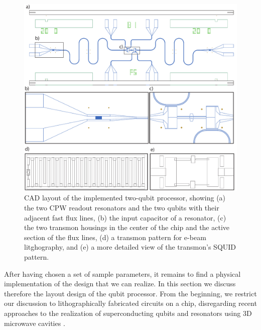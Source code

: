 \begin{figure}[ht!]
	\centering
	\includegraphics[width=\textwidth]{./material/figures/2-qubit-processor/fabrication/qubit_processor_layout}
	\caption[]{CAD layout of the implemented two-qubit processor, showing (a) the two CPW readout resonators and the two qubits with their adjacent fast flux lines, (b) the input capacitor of a resonator, (c) the two transmon housings in the center of the chip and the active section of the flux lines, (d) a transmon pattern for e-beam litghography, and (e) a more detailed view of the transmon's SQUID pattern.}
	\label{fig:processor_fabrication}
\end{figure}

After having chosen a set of sample parameters, it remains to find a physical implementation of the design that we can realize. In this section we discuss therefore the layout design of the qubit processor. From the beginning, we restrict our discussion to lithographically fabricated circuits on a chip, disregarding recent approaches to the realization of superconducting qubits and resonators using 3D microwave cavities \citep{paik_observation_2011}.

\smallskip

